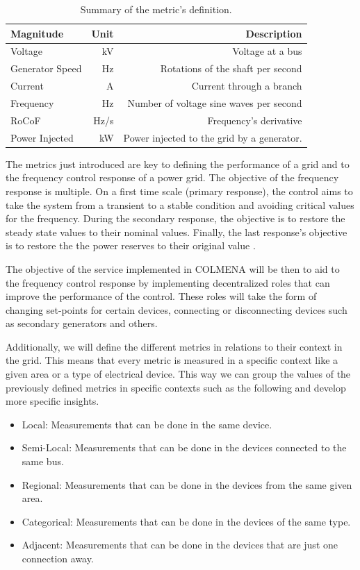 \documentclass{article}
\begin{document}
\begin{table}[H]
    \centering
    \caption{Summary of the metric's definition.}
    \begin{tabular}{lrr}
        \hline
        \textbf{Magnitude} & \textbf{Unit} & \textbf{Description} \\
        \hline
        \hline
        Voltage & kV & Voltage at a bus \\
        Generator Speed & Hz & Rotations of the shaft per second\\
        Current & A & Current through a branch \\
        Frequency & Hz & Number of voltage sine waves per second\\
        RoCoF & Hz/s & Frequency's derivative \\
        Power Injected & kW & Power injected to the grid by a generator. \\
    \hline
    \end{tabular}
\end{table}
  

The metrics just introduced are key to defining the performance of a grid and to the frequency control response of a power grid. The objective of the frequency response is multiple. On a first time scale (primary response)\cite{source:NRELfrequency}, the control aims to take the system from a transient to a stable condition and avoiding critical values for the frequency. During the secondary response, the objective is to restore the steady state values to their nominal values. Finally, the last response's objective is to restore the the power reserves to their original value \cite{source:bookelectron}.

The objective of the service implemented in COLMENA will be then to aid to the frequency control response by implementing decentralized roles that can improve the performance of the control. These roles will take the form of changing set-points for certain devices, connecting or disconnecting devices such as secondary generators and others. 

Additionally, we will define the different metrics in relations to their context in the grid. This means that every metric is measured in a specific context like a given area or a type of electrical device. This way we can group the values of the previously defined metrics in specific contexts such as the following and develop more specific insights.

\begin{itemize}
\item Local: Measurements that can be done in the same device. 
\item Semi-Local: Measurements that can be done in the devices connected to the same bus. 
\item Regional: Measurements that can be done in the devices from the same given area. 
\item Categorical: Measurements that can be done in the devices of the same type. 
\item Adjacent: Measurements that can be done in the devices that are just one connection away.
\end{itemize}
\end{document}
